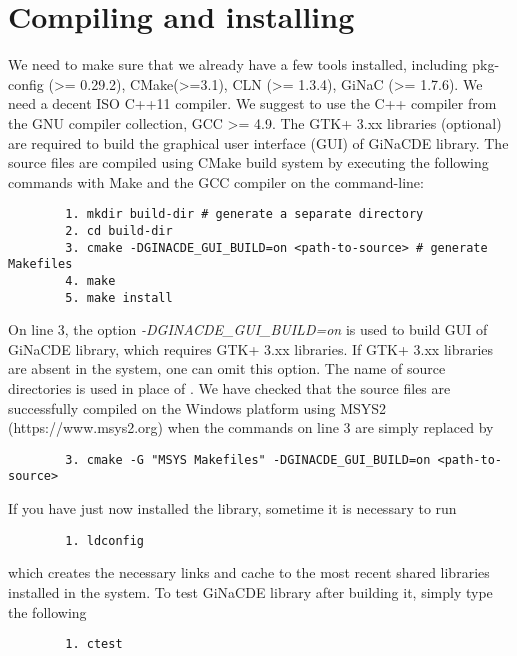 \documentclass[prd,aps,floats,showkeys,nofootinbib,notitlepage]{revtex4}
\begin{document}
	
		
	
	\section{Compiling and installing}\label{sec:compile}
	We need to make sure that we already have a few tools installed, including pkg-config (>= 0.29.2), CMake(>=3.1), CLN (>= 1.3.4), GiNaC (>= 1.7.6). We need a decent ISO C++11 compiler. We suggest to use the C++ compiler from the GNU compiler collection, GCC >= 4.9. The GTK+ 3.xx libraries (optional) are required to build the graphical user interface (GUI) of GiNaCDE library.
	The source files are compiled using CMake build system by executing the following commands with Make and the GCC compiler on the command-line:
	\begin{verbatim}
		1. mkdir build-dir # generate a separate directory
		2. cd build-dir
		3. cmake -DGINACDE_GUI_BUILD=on <path-to-source> # generate Makefiles
		4. make
		5. make install
	\end{verbatim}
	On line 3, the option {\em -DGINACDE\_GUI\_BUILD=on} is used to build GUI of GiNaCDE library, which requires GTK+ 3.xx libraries. If GTK+ 3.xx libraries are absent in the system, one can omit this option. The name of source directories is used in place of {\em <path-to-source>}. We have checked that the source files are successfully compiled on the Windows platform using MSYS2 (https://www.msys2.org) when the commands on line 3 are simply replaced by
	\begin{verbatim}
		3. cmake -G "MSYS Makefiles" -DGINACDE_GUI_BUILD=on <path-to-source>
	\end{verbatim}
	If you have just now installed the library, sometime it is necessary to run
	\begin{verbatim}
		1. ldconfig
	\end{verbatim}
	which creates the necessary links and cache to the most recent shared libraries installed in the system.
	To test GiNaCDE library after building it, simply type the following
	\begin{verbatim}
		1. ctest
	\end{verbatim}
	
\end{document}

